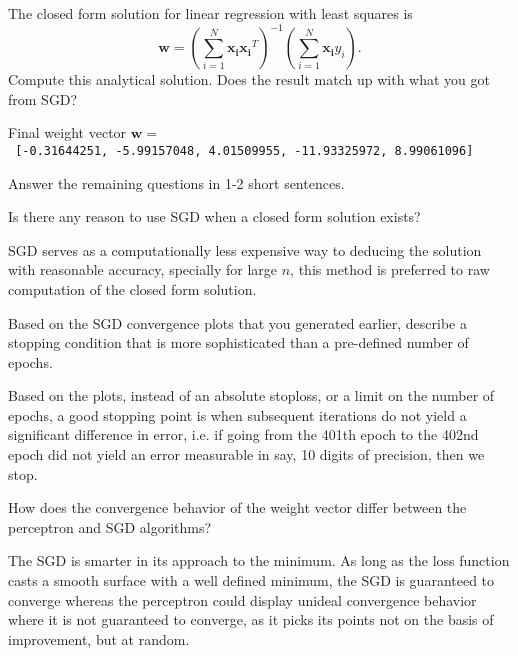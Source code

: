 \documentclass{article}
\begin{document}
\begin{problem}[2]
  The closed form solution for linear regression with least squares is \[\mathbf{w} = \left(\sum_{i=1}^N \mathbf{x_i}\mathbf{x_i}^T\right)^{-1}\left(\sum_{i=1}^N \mathbf{x_i}y_i\right).\]  Compute this analytical solution.  Does the result match up with what you got from SGD?
\end{problem}
\begin{solution}
 Final weight vector $\mathbf{w} = $\\
  \verb| [-0.31644251, -5.99157048, 4.01509955, -11.93325972, 8.99061096] |
\end{solution}
\newpage
Answer the remaining questions in 1-2 short sentences.

\begin{problem}[2]
  Is there any reason to use SGD when a closed form solution exists?
\end{problem}
\begin{solution}
  SGD serves as a computationally less expensive way to deducing the solution with reasonable accuracy, specially for large $n$, this method is preferred to raw computation of the closed form solution. 
\end{solution}

\begin{problem}[2]
  Based on the SGD convergence plots that you generated earlier, describe a stopping condition that is more sophisticated than a pre-defined number of epochs.
\end{problem}
\begin{solution}
  Based on the plots, instead of an absolute stoploss, or a limit on the number of epochs, a good stopping point is when subsequent iterations do not yield a significant difference in error, i.e. if going from the 401th epoch to the 402nd epoch did not yield an error measurable in say, 10 digits of precision, then we stop.
\end{solution}
\begin{problem}[2]
How does the convergence behavior of the weight vector differ between the perceptron and SGD algorithms?
\end{problem}
\begin{solution}
The SGD is smarter in its approach to the minimum. As long as the loss function casts a smooth surface with a well defined minimum, the SGD is guaranteed to converge whereas the perceptron could display unideal convergence behavior where it is not guaranteed to converge, as it picks its points not on the basis of improvement, but at random.
\end{solution}
\end{document}
